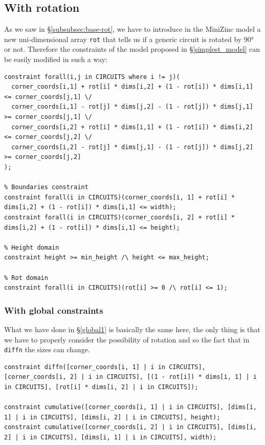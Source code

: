 \subsection{With rotation}
As we saw in \S\ref{subsubsec:base-rot}, we have to introduce in the MiniZinc model a new uni-dimensional array \texttt{rot} that tells us if a generic circuit is rotated by 90° or not. Therefore the constraints of the model proposed in \S\ref{simplest_model} can be easily modified in such a way:
\begin{lstlisting}[language=Mzn]
% No-overlap constraint
constraint forall(i,j in CIRCUITS where i != j)(
  corner_coords[i,1] + rot[i] * dims[i,2] + (1 - rot[i]) * dims[i,1] <= corner_coords[j,1] \/
  corner_coords[i,1] - rot[j] * dims[j,2] - (1 - rot[j]) * dims[j,1] >= corner_coords[j,1] \/
  corner_coords[i,2] + rot[i] * dims[i,1] + (1 - rot[i]) * dims[i,2] <= corner_coords[j,2] \/
  corner_coords[i,2] - rot[j] * dims[j,1] - (1 - rot[j]) * dims[j,2] >= corner_coords[j,2]
);

% Boundaries constraint
constraint forall(i in CIRCUITS)(corner_coords[i, 1] + rot[i] * dims[i,2] + (1 - rot[i]) * dims[i,1] <= width);
constraint forall(i in CIRCUITS)(corner_coords[i, 2] + rot[i] * dims[i,2] + (1 - rot[i]) * dims[i,1] <= height);

% Height domain
constraint height >= min_height /\ height <= max_height;

% Rot domain
constraint forall(i in CIRCUITS)(rot[i] >= 0 /\ rot[i] <= 1);
\end{lstlisting}

\subsubsection{With global constraints}
What we have done in \S\ref{global1} is basically the same here, the only thing is that we have to properly consider the possibility of rotation and so the fact that in \texttt{diffn} the sizes can change.
\begin{lstlisting}[language=Mzn]
constraint diffn([corner_coords[i, 1] | i in CIRCUITS], [corner_coords[i, 2] | i in CIRCUITS], [(1 - rot[i]) * dims[i, 1] | i in CIRCUITS], [rot[i] * dims[i, 2] | i in CIRCUITS]);

constraint cumulative([corner_coords[i, 1] | i in CIRCUITS], [dims[i, 1] | i in CIRCUITS], [dims[i, 2] | i in CIRCUITS], height);            
constraint cumulative([corner_coords[i, 2] | i in CIRCUITS], [dims[i, 2] | i in CIRCUITS], [dims[i, 1] | i in CIRCUITS], width);   
\end{lstlisting}

